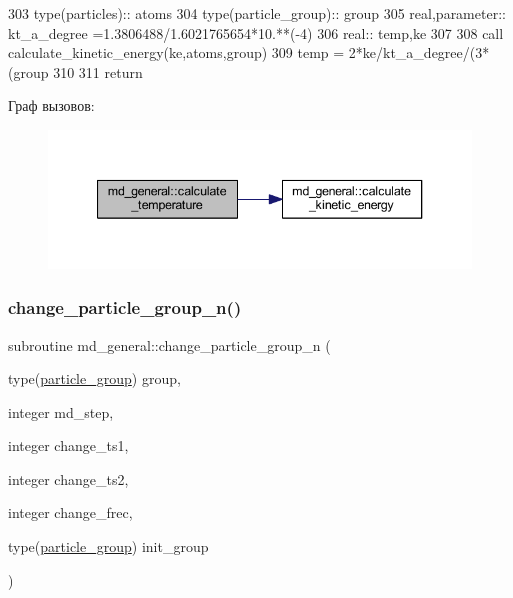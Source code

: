 \begin{DoxyCode}
303     \textcolor{keywordtype}{type}(particles)::   atoms
304     \textcolor{keywordtype}{type}(particle\_group):: group
305     \textcolor{keywordtype}{real},\textcolor{keywordtype}{parameter}::    kt\_a\_degree =1.3806488/1.6021765654*10.**(-4)
306     \textcolor{keywordtype}{real}:: temp,ke
307     
308     \textcolor{keyword}{call }calculate\_kinetic\_energy(ke,atoms,group)
309     temp = 2*ke/kt\_a\_degree/(3*(group%
310     
311     \textcolor{keywordflow}{return}
\end{DoxyCode}
Граф вызовов\+:\nopagebreak
\begin{figure}[H]
\begin{center}
\leavevmode
\includegraphics[width=340pt]{namespacemd__general_a1de2d09f44a8dc5b96fc5eb221845cc1_cgraph}
\end{center}
\end{figure}
\mbox{\label{namespacemd__general_a5614c27d83ed003aa01d3be2f1b45c57}} 
\subsubsection{\texorpdfstring{change\+\_\+particle\+\_\+group\+\_\+n()}{change\_particle\_group\_n()}}
{\footnotesize\ttfamily subroutine md\+\_\+general\+::change\+\_\+particle\+\_\+group\+\_\+n (\begin{DoxyParamCaption}\item[{type(\mbox{\hyperlink{structmd__general_1_1particle__group}{particle\+\_\+group}})}]{group,  }\item[{integer}]{md\+\_\+step,  }\item[{integer}]{change\+\_\+ts1,  }\item[{integer}]{change\+\_\+ts2,  }\item[{integer}]{change\+\_\+frec,  }\item[{type(\mbox{\hyperlink{structmd__general_1_1particle__group}{particle\+\_\+group}})}]{init\+\_\+group }\end{DoxyParamCaption})}



